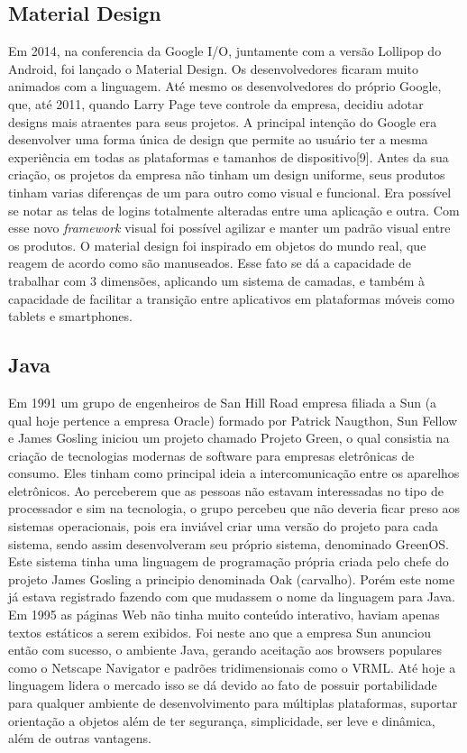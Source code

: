 \documentclass[12pt]{article}
\begin{document}
\subsection{Material Design}
Em 2014, na conferencia da Google I/O, juntamente com a versão Lollipop do Android, foi lançado o Material Design. Os desenvolvedores ficaram muito animados com a linguagem. Até mesmo os desenvolvedores do próprio Google, que, até 2011, quando Larry Page teve controle da empresa, decidiu adotar designs mais atraentes para seus projetos.
A principal intenção do Google era desenvolver uma forma única de design que permite ao usuário ter a mesma experiência em todas as plataformas e tamanhos de dispositivo[9]. Antes da sua criação, os projetos da empresa não tinham um design uniforme, seus produtos tinham varias diferenças de um para outro como visual e funcional. Era possível se notar as telas de logins totalmente alteradas entre uma aplicação e outra. Com esse novo \textit{framework} visual foi possível agilizar e manter um padrão visual entre os produtos.
O material design foi inspirado em objetos do mundo real, que reagem de acordo como são manuseados. Esse fato se dá a capacidade de trabalhar com 3 dimensões, aplicando um sistema de camadas, e também à capacidade de facilitar a transição entre aplicativos em plataformas móveis como tablets e smartphones.

\subsection{Java}
Em 1991 um grupo de engenheiros de San Hill Road empresa filiada a Sun (a qual hoje pertence a empresa Oracle) formado por Patrick Naugthon, Sun Fellow e James Gosling iniciou um projeto chamado Projeto Green, o qual consistia na criação de tecnologias modernas de software para empresas eletrônicas de consumo. Eles tinham como principal ideia a intercomunicação entre os aparelhos eletrônicos.
Ao perceberem que as pessoas não estavam interessadas no tipo de processador e sim na tecnologia, o grupo percebeu que não deveria ficar preso aos sistemas operacionais, pois era inviável criar uma versão do projeto para cada sistema, sendo assim desenvolveram seu próprio sistema, denominado GreenOS. Este sistema tinha uma linguagem de programação própria criada pelo chefe do projeto James Gosling a principio denominada Oak (carvalho). Porém este nome já estava registrado fazendo com que mudassem o nome da linguagem para Java.
Em 1995 as páginas Web não tinha muito conteúdo interativo, haviam apenas textos estáticos a serem exibidos. Foi neste ano que a empresa Sun anunciou então com sucesso, o ambiente Java, gerando aceitação aos browsers populares como o Netscape Navigator e padrões tridimensionais como o VRML.
Até hoje a linguagem lidera o mercado isso se dá devido ao fato de possuir portabilidade para qualquer ambiente de desenvolvimento para múltiplas plataformas, suportar orientação a objetos além de ter segurança, simplicidade, ser leve e dinâmica, além de outras vantagens.
\end{document}
